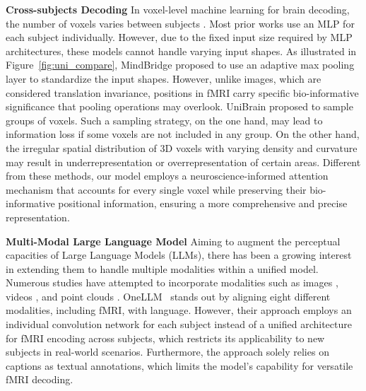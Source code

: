 \noindent\textbf{Cross-subjects Decoding}
In voxel-level machine learning for brain decoding, the number of voxels varies between subjects \cite{allen2022massive}. Most prior works \cite{scotti2024reconstructing,scotti2024mindeye2} use an MLP for each subject individually. However, due to the fixed input size required by MLP architectures, these models cannot handle varying input shapes. As illustrated in Figure~\ref{fig:uni_compare}, MindBridge \cite{wang2024mindbridge} proposed to use an adaptive max pooling layer to standardize the input shapes. However, unlike images, which are considered translation invariance, positions in fMRI carry specific bio-informative significance that pooling operations may overlook. UniBrain \cite{wang2024unibrain} proposed to sample groups of voxels. Such a sampling strategy, on the one hand, may lead to information loss if some voxels are not included in any group. On the other hand, the irregular spatial distribution of 3D voxels with varying density and curvature may result in underrepresentation or overrepresentation of certain areas. Different from these methods, our model employs a neuroscience-informed attention mechanism that accounts for every single voxel while preserving their bio-informative positional information, ensuring a more comprehensive and precise representation. 


\noindent\textbf{Multi-Modal Large Language Model}
Aiming to augment the perceptual capacities of Large Language Models (LLMs), there has been a growing interest in extending them to handle multiple modalities within a unified model. Numerous studies have attempted to incorporate modalities such as images \cite{alayrac2022flamingo,zhang2023internlm,wang2023cogvlm}, videos \cite{cheng2024videollama, kondratyuk2023videopoet,zhang2023video}, and point clouds \cite{xu2023pointllm,qi2025shapellm}. %
OneLLM~\cite{han2024onellm} stands out by aligning eight different modalities, including fMRI, with language. However, their approach employs an individual convolution network for each subject instead of a unified architecture for fMRI encoding across subjects, which restricts its applicability to new subjects in real-world scenarios. Furthermore, the approach solely relies on captions as textual annotations, which limits the model's capability for versatile fMRI decoding. 

